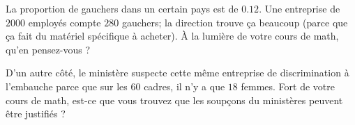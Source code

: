 
\begin{exercice}[\ldots/4]\label{exosmath-0672}

    La proportion de gauchers dans un certain pays est de \( 0.12\). Une entreprise de \( 2000\) employés compte \( 280\) gauchers; la direction trouve ça beaucoup (parce que ça fait du matériel spécifique à acheter). À la lumière de votre cours de math, qu'en pensez-vous ?

    D'un autre côté, le ministère suspecte cette même entreprise de discrimination à l'embauche parce que sur les \( 60\) cadres, il n'y a que \( 18\) femmes. Fort de votre cours de math, est-ce que vous trouvez que les soupçons du ministères peuvent être justifiés ?

\end{exercice}
